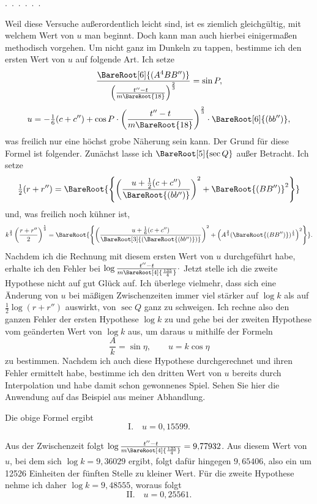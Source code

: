 \noindent\hspace*{\parindent}.\ .\ .\ .\ .\ .\par
Weil diese Versuche außerordentlich leicht sind, ist es ziemlich gleichgültig, mit welchem Wert von \(u\) man beginnt. Doch kann man auch hierbei einigermaßen methodisch vorgehen. Um nicht ganz im Dunkeln zu tappen, bestimme ich den ersten Wert von \(u\) auf folgende Art. Ich setze
\[
\frac{\BareRoot[6]{(A^4BB'')}}{\left(\frac{t''-t}{m\BareRoot{18}}\right)^{\frac23}}=\sin P,
\]
\[
u=-\tfrac16(c+c'')+\cos P\cdot\left(\frac{t''-t}{m\BareRoot{18}}\right)^{\frac23}\cdot\BareRoot[6]{(bb'')},
\]
was freilich nur eine höchst grobe Näherung sein kann. Der Grund für diese Formel ist folgender. Zunächst lasse ich \(\BareRoot[5]{\sec Q}\) außer Betracht. Ich setze
\[
\tfrac12(r+r'')=\BareRoot{\left\{\left(\frac{u+\frac12(c+c'')}{\BareRoot{(bb'')}}\right)^2+\BareRoot{(BB'')}^2\right\}}
\]
und, was freilich noch kühner ist,
\[
k^{\frac23}\left(\frac{r+r''}2\right)^{\frac13}=\BareRoot{\left\{\left(\frac{u+\frac16(c+c'')}{\BareRoot[3]{(\BareRoot{(bb'')})}}\right)^2+\left(A^{\frac23}(\BareRoot{(BB'')})^{\frac13}\right)^2\right\}}.
\]
Nachdem ich die Rechnung mit diesem ersten Wert von \(u\) durchgeführt habe, erhalte ich den Fehler bei \(\log\frac{t''-t}{m\BareRoot[4]{\frac{135}4}}\mathpunct{\cdot}\) Jetzt stelle ich die zweite Hypothese nicht auf gut Glück auf. Ich überlege vielmehr, dass sich eine Änderung von \(u\) bei mäßigen Zwischenzeiten immer viel stärker auf \(\log k\) als auf \(\tfrac12\log(r+r'')\) auswirkt, von \(\sec Q\) ganz zu schweigen. Ich rechne also den ganzen Fehler der ersten Hypothese \(\log k\) zu und gehe bei der zweiten Hypothese vom geänderten Wert von \(\log k\) aus, um daraus \(u\) mithilfe der Formeln
\[
\frac Ak=\sin\eta,\qquad u=k\cos\eta
\]
zu bestimmen. Nachdem ich auch diese Hypothese durchgerechnet und ihren Fehler ermittelt habe, bestimme ich den dritten Wert von \(u\) bereits durch Interpolation und habe damit schon gewonnenes Spiel. Sehen Sie hier die Anwendung auf das Beispiel aus meiner Abhandlung.

Die obige Formel ergibt
\[
\mathrm{I.}\quad u=0{,}15599.
\]

Aus der Zwischenzeit folgt \(\log\frac{t''-t}{m\BareRoot[4]{\frac{135}4}}=9{,}77932\). Aus diesem Wert von \(u\), bei dem sich \(\log k=9{,}36029\) ergibt, folgt dafür hingegen \(9{,}65406\), also ein um 12526 Einheiten der fünften Stelle zu kleiner Wert. Für die zweite Hypothese nehme ich daher \(\log k=9{,}48555\), woraus folgt
\[
\mathrm{II.}\quad u=0{,}25561.
\]


